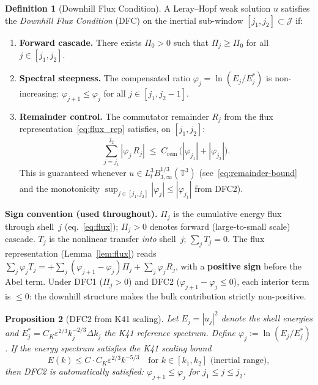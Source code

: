 \documentclass[12pt,a4paper]{article}
\theoremstyle{definition}
\newtheorem{definition}{Definition}[section]
\theoremstyle{plain}
\newtheorem{proposition}[definition]{Proposition}
\theoremstyle{remark}
\begin{document}
\begin{definition}[Downhill Flux Condition]\label{def:DFC}
A Leray--Hopf weak solution $u$ satisfies the \emph{Downhill Flux
Condition} (DFC) on the inertial sub-window
$[j_1, j_2] \subset \mathcal{J}$ if:
\begin{enumerate}
  \item[\textup{(DFC1)}] \textbf{Forward cascade.}\;
    There exists $\Pi_0 > 0$ such that
    $\Pi_j \ge \Pi_0$ for all $j \in [j_1, j_2]$.
  \item[\textup{(DFC2)}] \textbf{Spectral steepness.}\;
    The compensated ratio $\varphi_j = \ln(E_j/E_j^*)$ is non-increasing:
    $\varphi_{j+1} \le \varphi_j$ for all $j \in [j_1, j_2-1]$.
  \item[\textup{(DFC3)}] \textbf{Remainder control.}\;
    The commutator remainder $R_j$ from the flux
    representation~\eqref{eq:flux_rep} satisfies, on $[j_1, j_2]$:
    \begin{equation}\label{eq:DFC3-concrete}
      \sum_{j=j_1}^{j_2} |\varphi_j\,R_j|
      \;\le\;
      C_{\mathrm{rem}}\,
      \bigl(|\varphi_{j_1}| + |\varphi_{j_2}|\bigr).
    \end{equation}
    This is guaranteed whenever
    $u \in L^3_t B^{1/3}_{3,\infty}(\mathbb{T}^3)$
    (see~\eqref{eq:remainder-bound} and the monotonicity
    $\sup_{j \in [j_1,j_2]}|\varphi_j| \le |\varphi_{j_1}|$
    from DFC2).
\end{enumerate}
\end{definition}

\noindent
\textbf{Sign convention (used throughout).}\;
$\Pi_j$ is the cumulative energy flux through shell~$j$
(eq.~\eqref{eq:flux}); $\Pi_j > 0$ denotes forward (large-to-small
scale) cascade. $T_j$ is the nonlinear transfer \emph{into} shell~$j$;
$\sum_j T_j = 0$. The flux representation (Lemma~\ref{lem:flux}) reads
$\sum_j \varphi_j T_j = +\sum_j(\varphi_{j+1}-\varphi_j)\Pi_j +
\sum_j \varphi_j R_j$, with a \textbf{positive sign} before the Abel
term. Under DFC1 ($\Pi_j > 0$) and DFC2 ($\varphi_{j+1} - \varphi_j
\le 0$), each interior term is $\le 0$: the downhill structure makes
the bulk contribution strictly non-positive.

\begin{proposition}[DFC2 from K41 scaling]\label{prop:dfc2-from-k41}
Let $E_j = |u_j|^2$ denote the shell energies and $E_j^* = C_K \varepsilon^{2/3} k_j^{-2/3} \Delta k_j$ the K41 reference spectrum. Define $\varphi_j := \ln(E_j / E_j^*)$. If the energy spectrum satisfies the K41 scaling bound
\begin{equation}\label{eq:k41-scaling-bound}
  E(k) \leq C \cdot C_K \varepsilon^{2/3} k^{-5/3} \quad \text{for } k \in [k_1, k_2] \text{ (inertial range)},
\end{equation}
then DFC2 is automatically satisfied: $\varphi_{j+1} \leq \varphi_j$ for $j_1 \leq j \leq j_2$.
\end{proposition}
\end{document}
